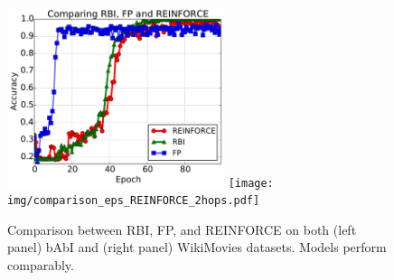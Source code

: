 \begin{figure}[!htb]
\includegraphics[width=2.5in]{img/RBIvsRF6.pdf}
\texttt{[image: img/comparison\_eps\_REINFORCE\_2hops.pdf]}
\caption[Comparison between RBI, FP, and REINFORCE on both bAbI and WikiMovies datasets.]{Comparison between RBI, FP, and REINFORCE on both (left panel) bAbI and (right panel) WikiMovies datasets.
Models perform comparably.
\label{fig:online-comparison-rbi-fp-rf}
}
\end{figure}
\fi

